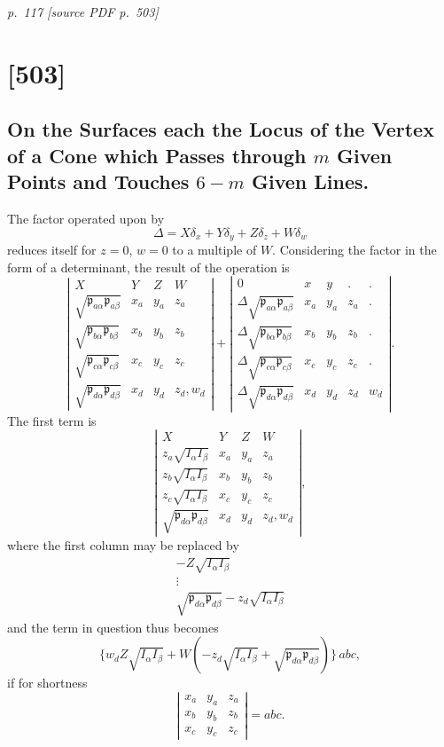 \documentclass[11pt,a4paper]{article}
\newcommand{\sourcepage}[2]{%
  \bigskip
  \noindent\textit{p.~#1 [source PDF p.~#2]}%
  \par\smallskip
}
\newcommand{\papersection}[2]{%
  \section{[#1]}
  \subsection{#2}
}
\newcommand{\p}{\mathfrak p}
\begin{document}
\sourcepage{117}{503}
\papersection{503}{On the Surfaces each the Locus of the Vertex of a Cone which Passes through \(m\) Given Points and Touches \(6-m\) Given Lines.}

The factor operated upon by
\[
\Delta=X\delta_x+Y\delta_y+Z\delta_z+W\delta_w
\]
reduces itself for $z=0$, $w=0$ to a multiple of $W$. Considering the factor in the
form of a determinant, the result of the operation is
\[
\left|\begin{array}{cccc}
X&Y&Z&W\\
\sqrt{\p_{a\alpha}\p_{a\beta}}&x_a&y_a&z_a\\
\sqrt{\p_{b\alpha}\p_{b\beta}}&x_b&y_b&z_b\\
\sqrt{\p_{c\alpha}\p_{c\beta}}&x_c&y_c&z_c\\
\sqrt{\p_{d\alpha}\p_{d\beta}}&x_d&y_d&z_d,w_d
\end{array}\right|
+
\left|\begin{array}{ccccc}
0&x&y&.&.\\
\Delta\sqrt{\p_{a\alpha}\p_{a\beta}}&x_a&y_a&z_a&.\\
\Delta\sqrt{\p_{b\alpha}\p_{b\beta}}&x_b&y_b&z_b&.\\
\Delta\sqrt{\p_{c\alpha}\p_{c\beta}}&x_c&y_c&z_c&.\\
\Delta\sqrt{\p_{d\alpha}\p_{d\beta}}&x_d&y_d&z_d&w_d
\end{array}\right|.
\]
The first term is
\[
\left|\begin{array}{cccc}
X&Y&Z&W\\
z_a\sqrt{I_\alpha I_\beta}&x_a&y_a&z_a\\
z_b\sqrt{I_\alpha I_\beta}&x_b&y_b&z_b\\
z_c\sqrt{I_\alpha I_\beta}&x_c&y_c&z_c\\
\sqrt{\p_{d\alpha}\p_{d\beta}}&x_d&y_d&z_d,w_d
\end{array}\right|,
\]
where the first column may be replaced by
\[
\begin{array}{c}
-Z\sqrt{I_\alpha I_\beta}\\
\vdots\\
\sqrt{\p_{d\alpha}\p_{d\beta}}-z_d\sqrt{I_\alpha I_\beta}
\end{array}
\]
and the term in question thus becomes
\[
\{w_dZ\sqrt{I_\alpha I_\beta}
  +W(-z_d\sqrt{I_\alpha I_\beta}+\sqrt{\p_{d\alpha}\p_{d\beta}})\}\,abc,
\]
if for shortness
\[
\left|\begin{array}{ccc}
x_a&y_a&z_a\\
x_b&y_b&z_b\\
x_c&y_c&z_c
\end{array}\right|=abc.
\]
\end{document}
